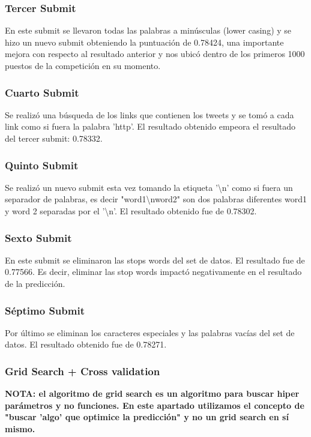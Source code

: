 \documentclass[12pt]{article}
\begin{document}
\subsubsection{Tercer Submit}
En este submit se llevaron todas las palabras a minúsculas (lower casing) y se hizo un nuevo submit obteniendo la puntuación de 0.78424, una importante mejora con respecto al resultado anterior y nos ubicó dentro de los primeros 1000 puestos de la competición en su momento.


\subsubsection{Cuarto Submit}
Se realizó una búsqueda de los links que contienen los tweets y se tomó a cada link como si fuera la palabra 'http'. El resultado obtenido empeora el resultado del tercer submit: 0.78332.


\subsubsection{Quinto Submit}
Se realizó un nuevo submit esta vez tomando la etiqueta '\textbackslash n' como si fuera un separador de palabras, es decir "word1\textbackslash nword2" son dos palabras diferentes word1 y word 2 separadas por el '\textbackslash n'.
El resultado obtenido fue de 0.78302.


\subsubsection{Sexto Submit}
En este submit se eliminaron las stops words del set de datos.
El resultado fue de 0.77566. Es decir, eliminar las stop words impactó negativamente en el resultado de la predicción.


\subsubsection{Séptimo Submit}
Por último se eliminan los caracteres especiales y las palabras vacías del set de datos.
El resultado obtenido fue de 0.78271.


\subsubsection{Grid Search + Cross validation}
\textbf{NOTA: el algoritmo de grid search es un algoritmo para buscar hiper parámetros y no funciones. En este apartado utilizamos el concepto de "buscar 'algo' que optimice la predicción" y no un grid search en sí mismo.\\}
\end{document}
